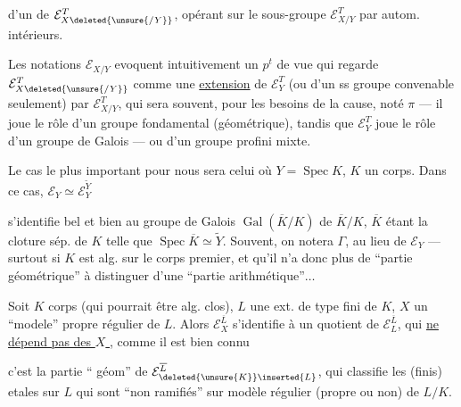 d'un  de $\mathcal E_{X\deleted{\unsure{/Y}}}^T$, opérant sur le sous-groupe $\mathcal E_{X/Y}^T$ par autom. intérieurs.

Les notations  $\mathcal E_{X/Y}$ evoquent intuitivement un $p^t$ de vue qui regarde $\mathcal E_{X\deleted{\unsure{/Y}}}^T$ comme une \uline{extension} de $\mathcal E_Y^T$ (ou d'un ss groupe convenable seulement) par $\mathcal E_{X/Y}^T$, qui sera souvent, pour les besoins de la cause, noté $\pi$ --- il joue le rôle d'un groupe fondamental (géométrique), tandis que $\mathcal E_Y^T$ joue le rôle d'un groupe de Galois --- ou d'un groupe profini mixte.


Le cas le plus important pour nous sera celui où $Y=\operatorname{Spec}K$, $K$ un corps.  Dans ce cas, $\mathcal E_Y\simeq\mathcal E_Y^{\widetilde Y}$



s'identifie bel et bien au groupe de Galois $\operatorname{Gal}(\overline K/K)$ de  $\overline K/K$, $\overline K$ étant la cloture sép. de $K$ telle que $\operatorname{Spec}\overline K\simeq\widetilde Y$. Souvent, on notera $\Gamma$,  au lieu de $\mathcal E_Y$ --- surtout si $K$ est alg. sur le corps premier, et qu'il n'a donc plus de ``partie géométrique'' à distinguer d'une ``partie arithmétique''$\ldots$

Soit  $K$  corps (qui pourrait être alg. clos), $L$ une ext. de type fini de $K$, $X$ un ``modele'' propre régulier de $L$. Alors $\mathcal E_X^{\overline L}$ s'identifie à un quotient de $\mathcal E_L^{\overline L}$, qui \uline{ne  dépend pas des  $X$ }, comme il est bien connu



c'est la partie `` géom'' de $\mathcal E_{\deleted{\unsure{K}}\inserted{L}}^{\overline L}$,    qui classifie les  (finis) etales sur $L$ qui sont ``non ramifiés'' sur \uline{} modèle  régulier (propre ou non) de $L/K$.

